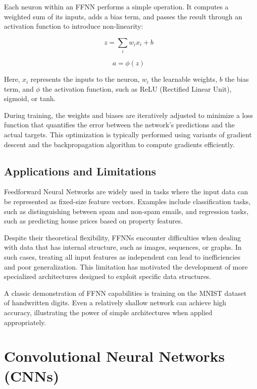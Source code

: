 \documentclass{book}
\begin{document}
Each neuron within an FFNN performs a simple operation. It computes a weighted 
sum of its inputs, adds a bias term, and passes the result through an activation 
function to introduce non-linearity:

\begin{equation}
z = \sum_{i} w_i x_i + b
\end{equation}

\begin{equation}
a = \phi(z)
\end{equation}

Here, $x_i$ represents the inputs to the neuron, $w_i$ the learnable weights, 
$b$ the bias term, and $\phi$ the activation function, such as ReLU (Rectified 
Linear Unit), sigmoid, or tanh.

During training, the weights and biases are iteratively adjusted to minimize a 
loss function that quantifies the error between the network's predictions and 
the actual targets. This optimization is typically performed using variants of 
gradient descent and the backpropagation algorithm to compute gradients 
efficiently.

\subsection{Applications and Limitations}

Feedforward Neural Networks are widely used in tasks where the input data can be 
represented as fixed-size feature vectors. Examples include classification 
tasks, such as distinguishing between spam and non-spam emails, and regression 
tasks, such as predicting house prices based on property features.

Despite their theoretical flexibility, FFNNs encounter difficulties when dealing 
with data that has internal structure, such as images, sequences, or graphs. In 
such cases, treating all input features as independent can lead to 
inefficiencies and poor generalization. This limitation has motivated the 
development of more specialized architectures designed to exploit specific data 
structures.

A classic demonstration of FFNN capabilities is training on the MNIST dataset of 
handwritten digits. Even a relatively shallow network can achieve high accuracy, 
illustrating the power of simple architectures when applied appropriately.

\section{Convolutional Neural Networks (CNNs)}
\end{document}
